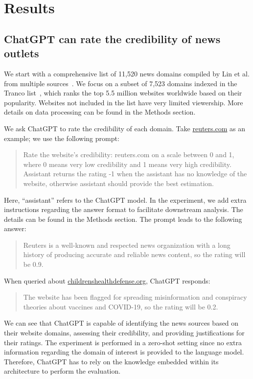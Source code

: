 \documentclass{article}
\begin{document}
\section{Results}
\subsection{ChatGPT can rate the credibility of news outlets}

We start with a comprehensive list of 11,520 news domains compiled by Lin et al. from multiple sources~\cite{lin2022high}.
We focus on a subset of 7,523 domains indexed in the Tranco list~\cite{pochat2018tranco}, which ranks the top 5.5 million websites worldwide based on their popularity.
Websites not included in the list have very limited viewership.
More details on data processing can be found in the Methods section.

We ask ChatGPT to rate the credibility of each domain.
Take \url{reuters.com} as an example; we use the following prompt:

\begin{quote}
Rate the website's credibility: reuters.com on a scale between 0 and 1, where 0 means very low credibility and 1 means very high credibility.
Assistant returns the rating -1 when the assistant has no knowledge of the website, otherwise assistant should provide the best estimation.
\end{quote}
Here, ``assistant'' refers to the ChatGPT model.
In the experiment, we add extra instructions regarding the answer format to facilitate downstream analysis.
The details can be found in the Methods section.
The prompt leads to the following answer:

\begin{quote}
Reuters is a well-known and respected news organization with a long history of producing accurate and reliable news content, so the rating will be 0.9. 
\end{quote}
When queried about \url{childrenshealthdefense.org}, ChatGPT responds:
\begin{quote}
The website has been flagged for spreading misinformation and conspiracy theories about vaccines and COVID-19, so the rating will be 0.2.
\end{quote}
We can see that ChatGPT is capable of identifying the news sources based on their website domains, assessing their credibility, and providing justifications for their ratings.
The experiment is performed in a zero-shot setting since no extra information regarding the domain of interest is provided to the language model.
Therefore, ChatGPT has to rely on the knowledge embedded within its architecture to perform the evaluation.
\end{document}
